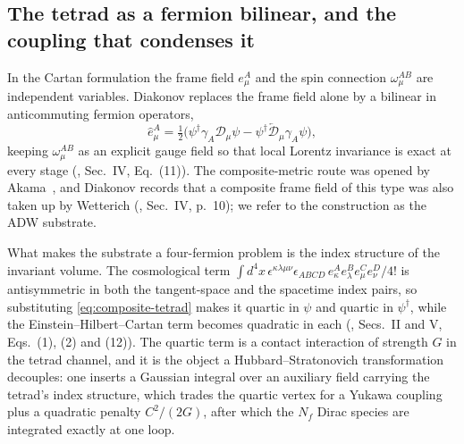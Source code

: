\documentclass[aps,prd,nofootinbib,superscriptaddress,12pt]{revtex4-2}
\begin{document}
\subsection{The tetrad as a fermion bilinear, and the coupling that condenses it}
\label{sec:substrate-gap}

In the Cartan formulation the frame field $e^{A}_{\mu}$ and the spin
connection $\omega^{AB}_{\mu}$ are independent variables. Diakonov replaces
the frame field alone by a bilinear in anticommuting fermion operators,
\begin{equation}
\label{eq:composite-tetrad}
\hat{e}^{A}_{\mu}
= \tfrac{1}{2}\bigl(
\psi^{\dagger}\gamma_{A}\mathcal{D}_{\mu}\psi
- \psi^{\dagger}\overleftarrow{\mathcal{D}}_{\mu}\gamma_{A}\psi\bigr),
\end{equation}
keeping $\omega^{AB}_{\mu}$ as an explicit gauge field so that local Lorentz
invariance is exact at every stage (\cite{Diakonov2011}, Sec.~IV,
Eq.~(11)). The composite-metric route was opened by Akama~\cite{Akama1978},
and Diakonov records that a composite frame field of this type was also
taken up by Wetterich (\cite{Diakonov2011}, Sec.~IV, p.~10); we refer to
the construction as the ADW substrate.

What makes the substrate a four-fermion problem is the index structure of
the invariant volume. The cosmological term
$\int d^{4}x\,\epsilon^{\kappa\lambda\mu\nu}\epsilon_{ABCD}\,
e^{A}_{\kappa}e^{B}_{\lambda}e^{C}_{\mu}e^{D}_{\nu}/4!$
is antisymmetric in both the tangent-space and the spacetime index pairs,
so substituting \eqref{eq:composite-tetrad} makes it quartic in $\psi$ and
quartic in $\psi^{\dagger}$, while the Einstein--Hilbert--Cartan term
becomes quadratic in each (\cite{Diakonov2011}, Secs.~II and V,
Eqs.~(1), (2) and (12)). The quartic term is a contact interaction of
strength $G$ in the tetrad channel, and it is the object a
Hubbard--Stratonovich transformation decouples: one inserts a Gaussian
integral over an auxiliary field carrying the tetrad's index structure,
which trades the quartic vertex for a Yukawa coupling plus a quadratic
penalty $C^{2}/(2G)$, after which the $N_f$ Dirac species are integrated
exactly at one loop.
\end{document}
